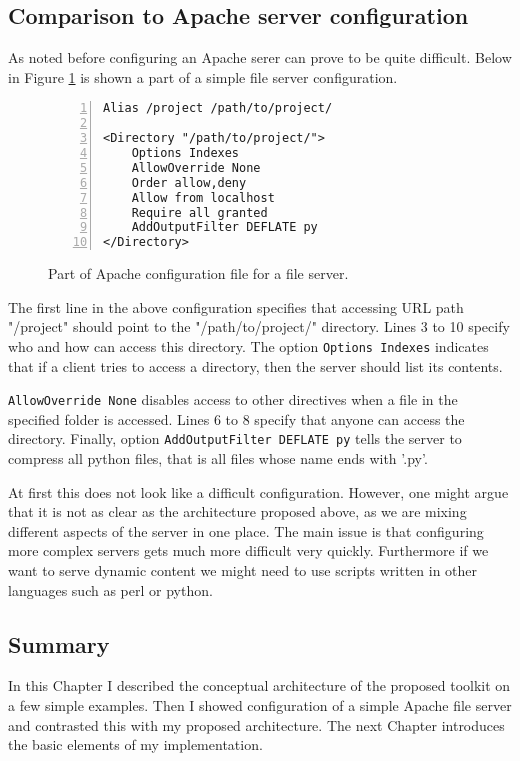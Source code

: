 \subsection{Comparison to Apache server configuration}
As noted before configuring an Apache serer can prove to be quite difficult.
Below in Figure \ref{fig:apache} is shown a part of a simple file server
configuration.
\begin{figure}[h]
\centering
\begin{lstlisting}[numbers=left]
Alias /project /path/to/project/

<Directory "/path/to/project/">
    Options Indexes
    AllowOverride None
    Order allow,deny
    Allow from localhost
    Require all granted
    AddOutputFilter DEFLATE py
</Directory>
\end{lstlisting}
\caption[scale=1.0]{Part of Apache configuration file for a file server.}
\label{fig:apache}
\end{figure}
The first line in the above configuration specifies that accessing URL 
path "/project" should point to the "/path/to/project/" directory.
Lines 3 to 10 specify who and how can access this directory.
The option \texttt{Options Indexes} indicates that if a client tries
to access a directory, then the server should list its contents.

\texttt{AllowOverride None} disables access to other directives when 
a file in the specified folder is accessed. Lines 6 to 8 specify that
anyone can access the directory. Finally, option 
\texttt{AddOutputFilter DEFLATE py} tells the server to compress
all python files, that is all files whose name ends with '.py'.

At first this does not look like a difficult configuration. However, 
one might argue that it is not as clear as the architecture proposed above,
as we are mixing different aspects of the server in one place.
The main issue is that configuring more complex servers gets much more 
difficult very quickly. Furthermore if we want to serve dynamic content
we might need to use scripts written in other languages such as perl or python.

\subsection{Summary}
In this Chapter I described the conceptual architecture of the proposed
toolkit on a few simple examples. Then I showed configuration of a simple
Apache file server and contrasted this with my proposed architecture.
The next Chapter introduces the basic elements of my implementation.
